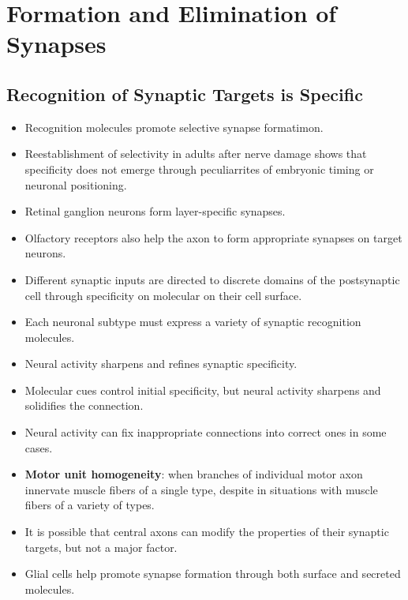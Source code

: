 \documentclass[12pt,a4paper]{article}
\begin{document}
\clearpage
\section{Formation and Elimination of Synapses}
\subsection{Recognition of Synaptic Targets is Specific}
\begin{itemize}
    \item Recognition molecules promote selective synapse formatimon.
    \item Reestablishment of selectivity in adults after nerve damage shows that specificity does not emerge through peculiarrites of embryonic timing or neuronal positioning.
    \item Retinal ganglion neurons form layer-specific synapses.
    \item Olfactory receptors also help the axon to form appropriate synapses on target neurons.
    \item Different synaptic inputs are directed to discrete domains of the postsynaptic cell through specificity on molecular on their cell surface.
    \item Each neuronal subtype must express a variety of synaptic recognition molecules.
    \item Neural activity sharpens and refines synaptic specificity.
    \item Molecular cues control initial specificity, but neural activity sharpens and solidifies the connection.
    \item Neural activity can fix inappropriate connections into correct ones in some cases.
    \item \textbf{Motor unit homogeneity}: when branches of individual motor axon innervate muscle fibers of a single type, despite in situations with muscle fibers of a variety of types.
    \item It is possible that central axons can modify the properties of their synaptic targets, but not a major factor.
    \item Glial cells help promote synapse formation through both surface and secreted molecules. 
\end{itemize}

\end{document}
